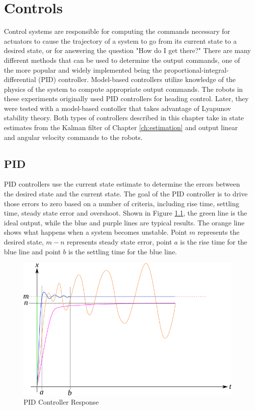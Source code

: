 \chapter{Controls}
\label{ch:controls}
Control systems are responsible for computing the commands necessary for actuators to cause the trajectory of a system to go from its current state to a desired state, or for answering the question "How do I get there?" There are many different methods that can be used to determine the output commands, one of the more popular and widely implemented being the proportional-integral-differential (PID) controller. Model-based controllers utilize knowledge of the physics of the system to compute appropriate output commands. The robots in these experiments originally used PID controllers for heading control. Later, they were tested with a model-based contoller that takes advantage of Lyapunov stability theory. Both types of controllers described in this chapter take in state estimates from the Kalman filter of Chapter \ref{ch:estimation} and output linear and angular velocity commands to the robots.

\section{PID}
\label{sec:pid}
PID controllers use the current state estimate to determine the errors between the desired state and the current state. The goal of the PID controller is to drive those errors to zero based on a number of criteria, including rise time, settling time, steady state error and overshoot. Shown in Figure \ref{fig:pid}, the green line is the ideal output, while the blue and purple lines are typical results. The orange line shows what happens when a system becomes unstable. Point $m$ represents the desired state, $m-n$ represents steady state error, point $a$ is the rise time for the blue line and point $b$ is the settling time for the blue line.

\begin{figure}[ht!]
	\centering
	\includegraphics[width=.85\textwidth]{images/pid}
	\caption{PID Controller Response}
	\label{fig:pid}
\end{figure}

